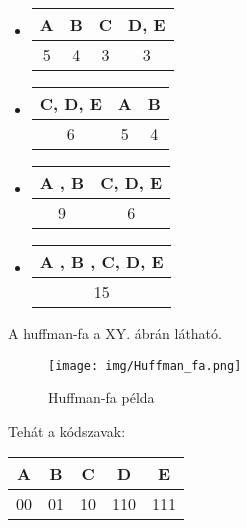 \documentclass[margin=0px]{article}
\begin{document}
\begin{itemize}
    \item \begin{tabular}{|c|c|c|c|}
              \hline A & B & C & D, E \\
              \hline 5 & 4 & 3 & 3    \\
              \hline
          \end{tabular}

    \item \begin{tabular}{|c|c|c|}
              \hline C, D, E & A & B \\
              \hline 6       & 5 & 4 \\
              \hline
          \end{tabular}

    \item \begin{tabular}{|c|c|}
              \hline A , B & C, D, E \\
              \hline 9     & 6       \\
              \hline
          \end{tabular}

    \item \begin{tabular}{|c|}
              \hline A , B , C, D, E \\
              \hline 15              \\
              \hline
          \end{tabular}
\end{itemize}

A huffman-fa a XY. ábrán látható.

\begin{figure}[H]
    \centering
    \texttt{[image: img/Huffman\_fa.png]}
    \caption{Huffman-fa példa}
    \label{fig:Huffman_fa}
\end{figure}

Tehát a kódszavak:

\begin{tabular}{|c|c|c|c|c|}
    \hline A  & B  & C  & D   & E   \\
    \hline 00 & 01 & 10 & 110 & 111 \\
    \hline
\end{tabular}
\end{document}
